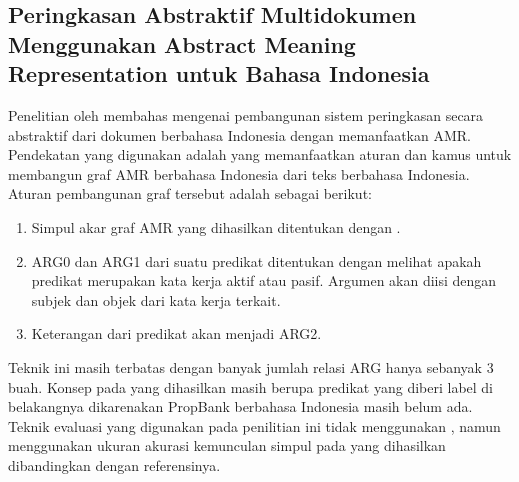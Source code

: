 \subsection{Peringkasan Abstraktif Multidokumen Menggunakan Abstract Meaning Representation untuk Bahasa Indonesia }

Penelitian oleh  membahas mengenai pembangunan sistem peringkasan secara abstraktif dari dokumen berbahasa Indonesia dengan memanfaatkan AMR.
Pendekatan yang digunakan adalah \amrparsing{} yang memanfaatkan aturan dan kamus untuk membangun graf AMR berbahasa Indonesia dari teks berbahasa Indonesia.
Aturan pembangunan graf tersebut adalah sebagai berikut:
\begin{enumerate}
  \item Simpul akar graf AMR yang dihasilkan ditentukan dengan .
  \item ARG0 dan ARG1 dari suatu predikat ditentukan dengan melihat apakah predikat merupakan kata kerja aktif atau pasif.
  Argumen akan diisi dengan subjek dan objek dari kata kerja terkait.
  \item Keterangan dari predikat akan menjadi ARG2.
\end{enumerate}

Teknik \amrparsing{} ini masih terbatas dengan banyak jumlah relasi ARG hanya sebanyak 3 buah.
Konsep pada \AMR{} yang dihasilkan masih berupa predikat yang diberi label  di belakangnya dikarenakan PropBank berbahasa Indonesia masih belum ada.
Teknik evaluasi yang digunakan pada penilitian ini tidak menggunakan \SMATCH{}, namun menggunakan ukuran akurasi kemunculan simpul pada \AMR{} yang dihasilkan dibandingkan dengan referensinya.
